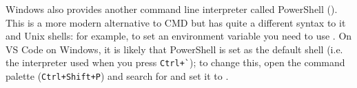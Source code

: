 Windows also provides another command line interpreter called
PowerShell (). This is a more modern alternative to CMD
but has quite a different syntax to it and Unix shells: for example,
to set an environment variable you need to use . On VS Code on Windows, it is likely that PowerShell is set as
the default shell (i.e. the interpreter used when you press
\verb|Ctrl+`|); to change this, open the command palette
(\verb|Ctrl+Shift+P|) and search for
 and set it to .
